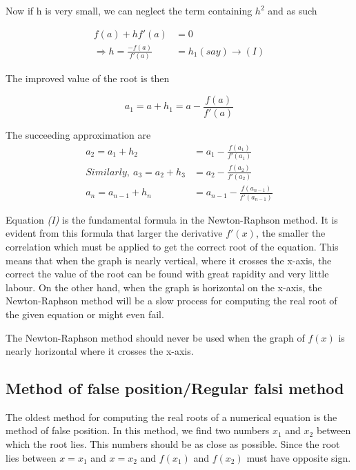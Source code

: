 \documentclass[11pt, a4paper, oneside]{book}
\begin{document}
            Now if h is very small, we can neglect the term containing $h^2$ and as such

            \begin{align*}
                                    f(a)+hf'(a) &= 0\\
              \Rightarrow h=\frac{-f(a)}{f'(a)} &= h_1(say)\rightarrow (I)
            \end{align*}

            The improved value of the root is then

            \begin{equation*}
              a_1=a+h_1=a-\frac{f(a)}{f'(a)}
            \end{equation*}

            The succeeding approximation are
            \begin{align*}
                          a_2=a_1+h_2 &= a_1-\frac{f(a_1)}{f'(a_1)}\\
              Similarly,\ a_3=a_2+h_3 &= a_2-\frac{f(a_2)}{f'(a_2)}\\
                      a_n=a_{n-1}+h_n &= a_{n-1}-\frac{f(a_{n-1})}{f'(a_{n-1})}
            \end{align*}

            Equation \textit{(I)} is the fundamental formula in the Newton-Raphson method.
            It is evident from this formula that larger the derivative $f'(x)$, the smaller
            the correlation which must be applied to get the correct root of the equation.
            This means that when the graph is nearly vertical, where it crosses the x-axis,
            the correct the value of the root can be found with great rapidity and very little
            labour. On the other hand, when the graph is horizontal on the x-axis, the Newton-Raphson
            method will be a slow process for computing the real root of the given equation
            or might even fail.

            The Newton-Raphson method should never be used when the graph of $f(x)$ is nearly
            horizontal where it crosses the x-axis.

          \subsection{Method of false position/Regular falsi method}
            The oldest method for computing the real roots of a numerical equation is the method
            of false position. In this method, we find two numbers $x_1$ and $x_2$ between which
            the root lies. This numbers should be as close as possible. Since the root lies
            between $x=x_1$ and $x=x_2$ and $f(x_1)$ and $f(x_2)$ must have opposite sign.
\end{document}
